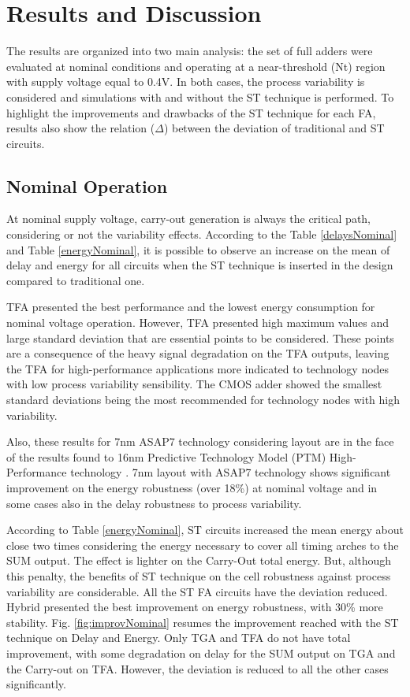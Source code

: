 \documentclass[ecp,tc, english]{iiufrgs}
\begin{document}
\chapter{Results and Discussion}

The results are organized into two main analysis: the set of full adders were evaluated at nominal conditions and operating at a near-threshold (Nt) region with supply voltage equal to 0.4V. In both cases, the process variability is considered and simulations with and without the ST technique is performed. To highlight the improvements and drawbacks of the ST technique for each FA, results also show the relation (\(\Delta\)) between the deviation of traditional and ST circuits.

\section{Nominal Operation}

At nominal supply voltage, carry-out generation is always the critical path, considering or not the variability effects. According to the Table \ref{delaysNominal} and Table \ref{energyNominal}, it is possible to observe an increase on the mean of delay and energy for all circuits when the ST technique is inserted in the design compared to traditional one.

TFA presented the best performance and the lowest energy consumption for nominal voltage operation. However, TFA presented high maximum values and large standard deviation that are essential points to be considered. These points are a consequence of the heavy signal degradation on the TFA outputs, leaving the TFA for high-performance applications more indicated to technology nodes with low process variability sensibility. The CMOS adder showed the smallest standard deviations being the most recommended for technology nodes with high variability. 

Also, these results for 7nm ASAP7 technology considering layout are in the face of the results found to 16nm Predictive Technology Model (PTM) High-Performance technology \cite{samuel2016}. 7nm layout with ASAP7 technology shows significant improvement on the energy robustness (over 18\%) at nominal voltage and in some cases also in the delay robustness to process variability. 

According to Table \ref{energyNominal}, ST circuits increased the mean energy about close two times considering the energy necessary to cover all timing arches to the SUM output. The effect is lighter on the Carry-Out total energy. But, although this penalty, the benefits of ST technique on the cell robustness against process variability are considerable. All the ST FA circuits have the deviation reduced. Hybrid presented the best improvement on energy robustness, with 30\% more stability. Fig. \ref{fig:improvNominal} resumes the improvement reached with the ST technique on Delay and Energy. Only TGA and TFA do not have total improvement, with some degradation on delay for the SUM output on TGA and the Carry-out on TFA. However, the deviation is reduced to all the other cases significantly.
\end{document}
